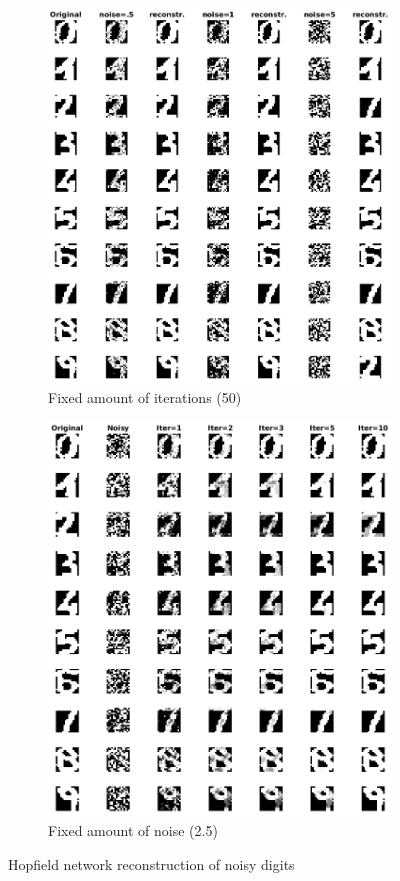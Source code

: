 \documentclass[11pt, a4paper]{article}
\begin{document}
\begin{figure}[H]
    \centering
    \begin{subfigure}{.5\textwidth}
      \centering
      \includegraphics[width=0.90\linewidth]{ndigits_fi1.png}
      \caption{Fixed amount of iterations (50)}
      \label{fig:ndigits1}
    \end{subfigure}%
    \begin{subfigure}{.5\textwidth}
      \centering
      \includegraphics[width=0.85\linewidth]{ndigits_fn2.png}
      \caption{Fixed amount of noise (2.5)}
      \label{fig:ndigits2}
    \end{subfigure}
    \caption{Hopfield network reconstruction of noisy digits}
    \label{fig:ndigit}
\end{figure}
\end{document}

